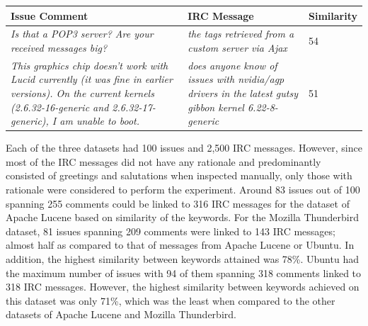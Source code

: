 \documentclass[a4paper,12pt,twoside]{report}
\begin{document}
\begin{table} %
    \centering
    \begin{adjustbox}{max width=\columnwidth}
    \def\arraystretch{1} %
    \begin{tabular}{p{6cm} p{6cm} p{2cm}}
        \toprule
        \textbf{Issue Comment} & \textbf{\acs{IRC} Message} & \textbf{Similarity}\\
        \midrule
			\textit{Is that a POP3 server? Are your received messages big?} & \textit{the tags retrieved from a custom server via Ajax} & 54 \\
			\midrule
			\textit{This graphics chip doesn't work with Lucid currently (it was fine in earlier versions). On the current kernels (2.6.32-16-generic and 2.6.32-17-generic), I am unable to boot.} & \textit{does anyone know of issues with nvidia/agp drivers in the latest gutsy gibbon kernel 6.22-8-generic} & 51 \\
        \midrule
    \end{tabular}
    \end{adjustbox}
    \label{tab:exampleLinking}
\end{table}
\leavevmode
\newline
Each of the three datasets had 100 issues and 2,500 \acs{IRC} messages. However, since most of the \acs{IRC} messages did not have any rationale and predominantly consisted of greetings and salutations when inspected manually, only those with rationale were considered to perform the experiment. Around 83 issues out of 100 spanning 255 comments could be linked to 316 \acs{IRC} messages for the dataset of Apache Lucene based on similarity of the keywords. For the Mozilla Thunderbird dataset, 81 issues spanning 209 comments were linked to 143 \acs{IRC} messages; almost half as compared to that of messages from Apache Lucene or Ubuntu. In addition, the highest similarity between keywords attained was 78\%. Ubuntu had the maximum number of issues with 94 of them spanning 318 comments linked to 318 \acs{IRC} messages. However, the highest similarity between keywords achieved on this dataset was only 71\%, which was the least when compared to the other datasets of Apache Lucene and Mozilla Thunderbird. 
\end{document}
